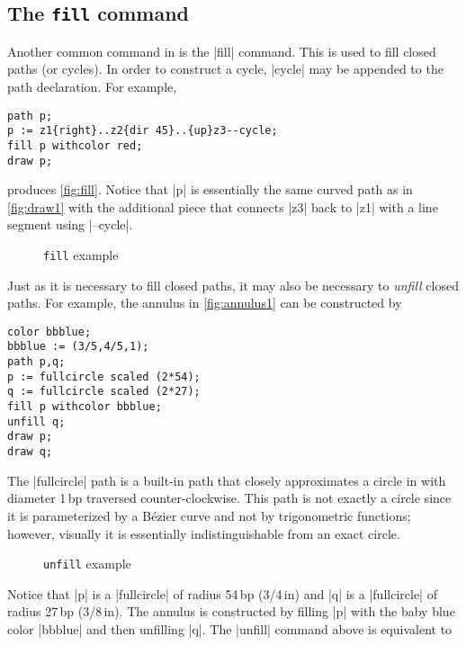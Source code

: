 \subsection{The \texttt{fill} command}

Another common command in \MP{} is the |fill| command.  This is used to
fill closed paths (or cycles).  In order to construct a cycle, |cycle|
may be appended to the path declaration.  For example,

\begin{lstlisting}[style=MP]
path p;
p := z1{right}..z2{dir 45}..{up}z3--cycle;
fill p withcolor red;
draw p;
\end{lstlisting}
produces \autoref{fig:fill}.  Notice that |p| is essentially the same
curved path as in \autoref{fig:draw1} with the additional piece that
connects |z3| back to |z1| with a line segment using |--cycle|.

\begin{figure}
  \centering
  \caption{\texttt{fill} example}
  \label{fig:fill}
\end{figure}

Just as it is necessary to fill closed paths, it may also be necessary
to \textit{unfill} closed paths.  For example, the annulus in
\autoref{fig:annulus1} can be constructed by

\begin{lstlisting}[style=MP]
color bbblue;
bbblue := (3/5,4/5,1);
path p,q;
p := fullcircle scaled (2*54);
q := fullcircle scaled (2*27);
fill p withcolor bbblue;
unfill q;
draw p;
draw q;
\end{lstlisting}

The |fullcircle| path is a built-in path that closely
approximates a circle in \MP{} with diameter 1\,bp traversed
counter-clockwise.  This path is not exactly a circle since it is
parameterized by a B\'{e}zier curve and not by trigonometric functions;
however, visually it is essentially indistinguishable from an exact
circle.

\begin{figure}
  \centering
  \caption{\texttt{unfill} example}
  \label{fig:annulus1}
\end{figure}

Notice that |p| is a |fullcircle| of radius 54\,bp (3/4\,in) and |q| is
a |fullcircle| of radius 27\,bp (3/8\,in).  The annulus is constructed
by filling |p| with the baby blue color |bbblue| and then unfilling |q|.
The |unfill| command above is equivalent to

